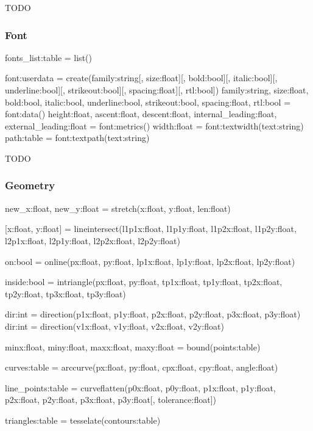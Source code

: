 TODO

\subsubsection{Font}
\label{sec:font}

fonts\_list:table = list()

font:userdata = create(family:string[, size:float][, bold:bool][, italic:bool][, underline:bool][, strikeout:bool][, spacing:float][, rtl:bool])
family:string, size:float, bold:bool, italic:bool, underline:bool, strikeout:bool, spacing:float, rtl:bool = font:data()
height:float, ascent:float, descent:float, internal\_leading:float, external\_leading:float = font:metrics()
width:float = font:textwidth(text:string)
path:table = font:textpath(text:string)

TODO

\subsubsection{Geometry}
\label{sec:geometry}

new\_x:float, new\_y:float = stretch(x:float, y:float, len:float)

[x:float, y:float] = lineintersect(l1p1x:float, l1p1y:float, l1p2x:float, l1p2y:float, l2p1x:float, l2p1y:float, l2p2x:float, l2p2y:float)

on:bool = online(px:float, py:float, lp1x:float, lp1y:float, lp2x:float, lp2y:float)

inside:bool = intriangle(px:float, py:float, tp1x:float, tp1y:float, tp2x:float, tp2y:float, tp3x:float, tp3y:float)

dir:int = direction(p1x:float, p1y:float, p2x:float, p2y:float, p3x:float, p3y:float)
dir:int = direction(v1x:float, v1y:float, v2x:float, v2y:float)

minx:float, miny:float, maxx:float, maxy:float = bound(points:table)

curves:table = arccurve(px:float, py:float, cpx:float, cpy:float, angle:float)

line\_points:table = curveflatten(p0x:float, p0y:float, p1x:float, p1y:float, p2x:float, p2y:float, p3x:float, p3y:float[, tolerance:float])

triangles:table = tesselate(contours:table)

